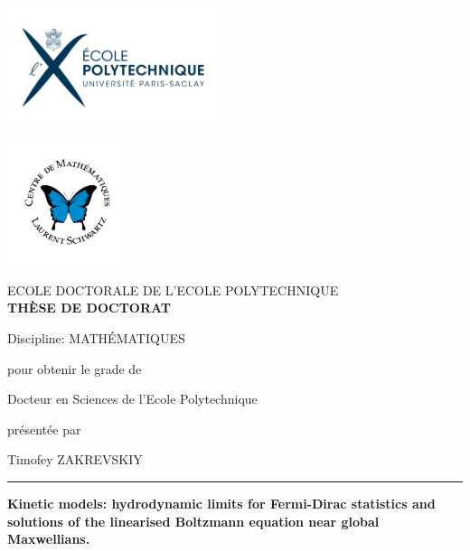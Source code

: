 \begin{titlingpage}
\begin{minipage}[b]{0.5\textwidth}%
\noindent
\includegraphics[height=100pt,left]{Images/LogoEcolepolytechniquehorizontalbleu.pdf}
\end{minipage}\begin{minipage}[b]{0.5\textwidth}
		\includegraphics[height=100pt,right]{Images/LogoCMLS-Couleur-Version2015-2.pdf}
\end{minipage}

\begin{center}
\begin{otherlanguage}{french}%
\Large{ECOLE DOCTORALE DE L'ECOLE POLYTECHNIQUE}\\[10pt]
 


 
	\Large{\textbf{THÈSE DE DOCTORAT}}

	\large{Discipline: MATHÉMATIQUES}

pour obtenir le grade de

Docteur en Sciences de l'Ecole Polytechnique
 
 présentée par

Timofey ZAKREVSKIY

\end{otherlanguage}%


\noindent\rule{\textwidth}{1pt}
			\LARGE{\bfseries Kinetic models: hydro\-dynamic limits for Fermi-Dirac statistics and solutions of the linearised Boltzmann equation near global Maxwellians.}%
\end{center}



\end{titlingpage}
